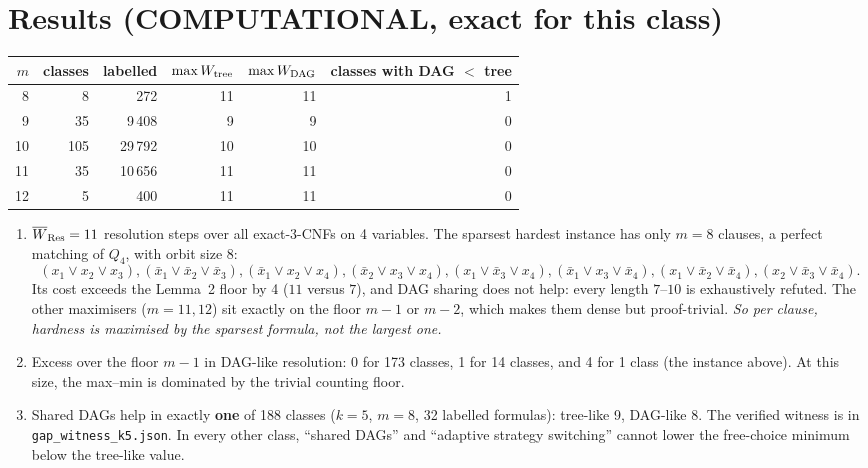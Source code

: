 \documentclass[11pt]{article}
\begin{document}
\section{Results (COMPUTATIONAL, exact for this class)}
\begin{center}
\begin{tabular}{rrrrrr}
$m$ & classes & labelled & $\max W_{\rm tree}$ & $\max W_{\rm DAG}$ & classes with DAG $<$ tree\\\hline
8 & 8 & 272 & 11 & 11 & 1\\
9 & 35 & 9\,408 & 9 & 9 & 0\\
10 & 105 & 29\,792 & 10 & 10 & 0\\
11 & 35 & 10\,656 & 11 & 11 & 0\\
12 & 5 & 400 & 11 & 11 & 0
\end{tabular}
\end{center}
\begin{enumerate}
\item $\overline W_{\rm Res}=11$ resolution steps over all exact-3-CNFs on 4 variables. The sparsest hardest instance has only $m=8$ clauses, a perfect matching of $Q_4$, with orbit size 8:
\[
(x_1{\vee}x_2{\vee}x_3),(\bar x_1{\vee}\bar x_2{\vee}\bar x_3),(\bar x_1{\vee}x_2{\vee}x_4),(\bar x_2{\vee}x_3{\vee}x_4),(x_1{\vee}\bar x_3{\vee}x_4),(\bar x_1{\vee}x_3{\vee}\bar x_4),(x_1{\vee}\bar x_2{\vee}\bar x_4),(x_2{\vee}\bar x_3{\vee}\bar x_4).
\]
Its cost exceeds the Lemma~2 floor by 4 ($11$ versus $7$), and DAG sharing does not help: every length $7$--$10$ is exhaustively refuted. The other maximisers ($m=11,12$) sit exactly on the floor $m-1$ or $m-2$, which makes them dense but proof-trivial. \emph{So per clause, hardness is maximised by the sparsest formula, not the largest one.}
\item Excess over the floor $m-1$ in DAG-like resolution: 0 for 173 classes, 1 for 14 classes, and 4 for 1 class (the instance above). At this size, the max--min is dominated by the trivial counting floor.
\item Shared DAGs help in exactly \textbf{one} of 188 classes ($k=5$, $m=8$, 32 labelled formulas): tree-like 9, DAG-like 8. The verified witness is in \texttt{gap\_witness\_k5.json}. In every other class, ``shared DAGs'' and ``adaptive strategy switching'' cannot lower the free-choice minimum below the tree-like value.
\end{enumerate}
\end{document}

